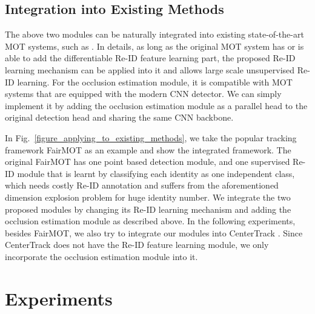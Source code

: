 \documentclass[final,1p,times,twocolumn]{elsarticle}
\newcommand{\fref}[1]{Fig.~\ref{#1}}
\begin{document}
	\subsection{Integration into Existing Methods}
	\label{section_applying_to_existing_methods}
	The above two modules can be naturally integrated into existing state-of-the-art MOT systems, such as \cite{wang2019towards, zhang2020fairmot,zhou2020tracking,liugsm}. In details, as long as the original MOT system has or is able to add the differentiable Re-ID feature learning part, the proposed Re-ID learning mechanism can be applied into it and allows large scale unsupervised Re-ID learning. For the occlusion estimation module, it is compatible with MOT systems that are equipped with the modern CNN detector. We can simply implement it by adding the occlusion estimation module as a parallel head to the original detection head and sharing the same CNN backbone. 
	
	In \fref{figure_applying_to_existing_methods}, we take the popular tracking framework FairMOT \cite{zhang2020fairmot} as an example and show the integrated framework. The original FairMOT has one point based detection module, and one supervised Re-ID module that is learnt by classifying each identity as one independent class, which needs costly Re-ID annotation and suffers from the aforementioned dimension explosion problem for huge identity number. We integrate the two proposed modules by changing its Re-ID learning mechanism and adding the occlusion estimation module as described above. In the following experiments, besides FairMOT, we also try to integrate our modules into CenterTrack \cite{zhou2020tracking}. Since CenterTrack does not have the Re-ID feature learning module, we only incorporate the occlusion estimation module into it.
	
	\section{Experiments}
	\label{section_experiments}
\end{document}
